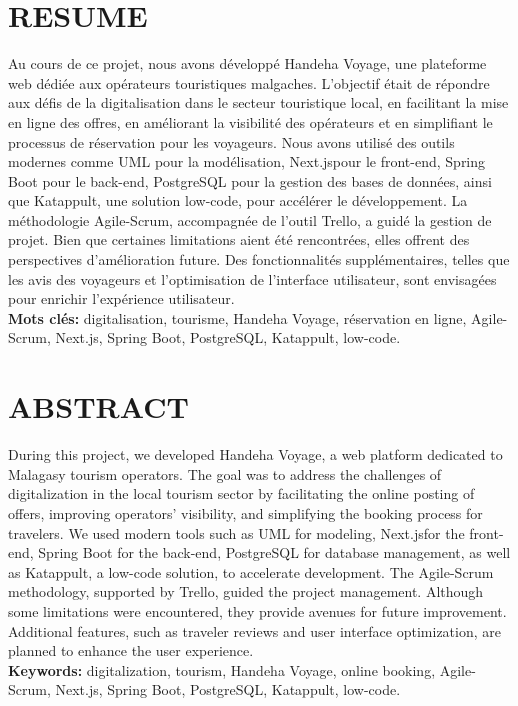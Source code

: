 \documentclass[12pt]{report}
\begin{document}
			\begin{center}
				\begin{minipage}{\textwidth}
					\chapter*{RESUME}

					\hspace{15pt} Au cours de ce projet, nous avons développé Handeha Voyage, une plateforme web dédiée aux opérateurs touristiques malgaches. L'objectif était de répondre aux défis de la digitalisation dans le secteur touristique local, en facilitant la mise en ligne des offres, en améliorant la visibilité des opérateurs et en simplifiant le processus de réservation pour les voyageurs. Nous avons utilisé des outils modernes comme UML pour la modélisation, Next.jspour le front-end, Spring Boot pour le back-end, PostgreSQL pour la gestion des bases de données, ainsi que Katappult, une solution low-code, pour accélérer le développement. La méthodologie Agile-Scrum, accompagnée de l'outil Trello, a guidé la gestion de projet. Bien que certaines limitations aient été rencontrées, elles offrent des perspectives d'amélioration future. Des fonctionnalités supplémentaires, telles que les avis des voyageurs et l'optimisation de l'interface utilisateur, sont envisagées pour enrichir l'expérience utilisateur.\\

					\textbf{Mots clés:} digitalisation, tourisme, Handeha Voyage, réservation en ligne, Agile-Scrum, Next.js, Spring Boot, PostgreSQL, Katappult, low-code.

					\chapter*{ABSTRACT}
	
					\hspace{15pt} During this project, we developed Handeha Voyage, a web platform dedicated to Malagasy tourism operators. The goal was to address the challenges of digitalization in the local tourism sector by facilitating the online posting of offers, improving operators' visibility, and simplifying the booking process for travelers. We used modern tools such as UML for modeling, Next.jsfor the front-end, Spring Boot for the back-end, PostgreSQL for database management, as well as Katappult, a low-code solution, to accelerate development. The Agile-Scrum methodology, supported by Trello, guided the project management. Although some limitations were encountered, they provide avenues for future improvement. Additional features, such as traveler reviews and user interface optimization, are planned to enhance the user experience.\\

					\textbf{Keywords:} digitalization, tourism, Handeha Voyage, online booking, Agile-Scrum, Next.js, Spring Boot, PostgreSQL, Katappult, low-code.
					
					\thispagestyle{empty}
				\end{minipage}
			\end{center}
				
\end{document}
